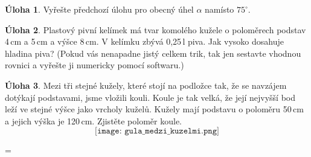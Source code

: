 \documentclass[10pt,a5paper]{extarticle}
\theoremstyle{definition}
\newtheorem{uloha}{\atr Úloha}
\DeclareMathOperator{\tg}{tg}
\def\vysld{}
\let\printvysl\relax
\def\atr{}
\def\interest{\def\atr{\llap{$\star$\,}\gdef\atr{}}}
\begin{document}
\interest
\begin{uloha}
Vyřešte předchozí úlohu pro obecný úhel $\alpha$ namísto $75^\circ$.\vyslplain{$\frac{1}{4} \sin ^3(2\alpha) \tg \alpha = 2 \cos^2 \alpha \sin^4 \alpha$}
\end{uloha}

\interest
\begin{uloha}
Plastový pivní kelímek má tvar komolého kužele o poloměrech podstav 4\,cm a 5\,cm 
a výšce 8\,cm. V kelímku zbývá 0,25\,l piva. Jak vysoko dosahuje hladina piva? (Pokud vás nenapadne jistý celkem trik, tak jen sestavte vhodnou rovnici a vyřešte ji numericky pomocí softwaru.)
\end{uloha}

\interest
\begin{uloha} %
Mezi tři stejné kužely, které stojí na podložce tak, že se navzájem dotýkají podstavami, jsme vložili kouli. Koule je tak velká, že její nejvyšší bod leží ve stejné výšce jako vrcholy kuželů. Kužely mají podstavu o poloměru 50\,cm a jejich výška je 120\,cm. Zjistěte poloměr koule.
\[ \texttt{[image: gula\_medzi\_kuzelmi.png]} \]
\end{uloha}

\newpage
\parindent=0pt
\parskip=\smallskipamount
\def\printvysl#1#2{\textbf{#1.}\ #2\par}
\vysld
\end{document}
